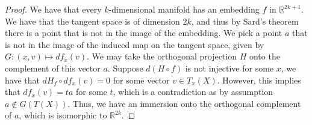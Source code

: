 \documentclass{article}
\begin{document}
                \begin{proof}
                  We have that every $k$-dimensional manifold has an embedding $f$ in $\mathbb{R}^{2k+1}$. We have that the tangent space is of dimension $2k$, and thus by Sard's theorem there is a point that is not in the image of the embedding. We pick a point $a$ that is not in the image of the induced map on the tangent space, given by $G: (x,v) \mapsto df_{x}(v)$. We may take the orthogonal projection $H$ onto the complement of this vector $a$. Suppose $d(H \circ f)$ is not injective for some $x$, we have that $dH_{f} \circ df_{x}(v) = 0$ for some vector $v \in T_{x}(X)$. However, this implies that $df_{x}(v) = ta$ for some $t$, which is a contradiction as by assumption $a \notin G(T(X))$. Thus, we have an immersion onto the orthogonal complement of $a$, which is isomorphic to $\mathbb{R}^{2k}$. 
                  \end{proof}
\end{document}
